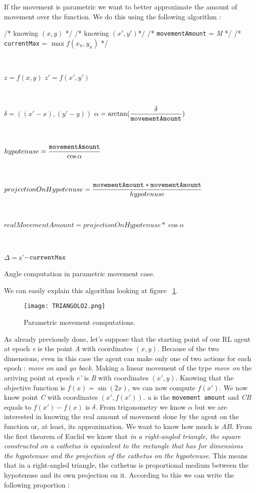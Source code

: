 If the movement is parametric we want to better approximate the amount of movement over the function. We do this using the following algorithm :

\begin{algorithm}
	/* knowing $(x, y)$ */ \;
	/* knowing $(x', y')$*/ \;
	/* {\tt movementAmount} = \textit{M} */ \;
	/* {\tt currentMax} = $\max f(x_n, y_n)$ */ \;
	
	
	\
	
	$z = f(x, y)$ \;
	$z' = f(x', y')$\;
	
	\
	
	$\delta = ((x'-x),  (y'-y))$ \;
	$\alpha = \arctan(\dfrac{\delta}{\tt movementAmount})$ \;
	
	\
	
	$hypotenuse = \dfrac{{\tt movementAmount}}{\cos \alpha}$ \;
	
	\
	
	$projectionOnHypotenuse = \dfrac{{\tt movementAmount} * {\tt movementAmount}}{hypotenuse}$ \;
	
	\
	
	$realMovementAmount = projectionOnHypotenuse * \cos \alpha$ \;
	 
	 \
	
	$\Delta = $z'$ - {\tt currentMax} $\;
	
	\caption{Angle computation in parametric movement case.} 
	\label{PMAlgo}
	
\end{algorithm}

We can easily explain this algorithm looking at figure ~\ref{fig:PMComputations}. 

\begin{figure} [h!]
	\centering
	\texttt{[image: TRIANGOLO2.png]}
	\caption{Parametric movement computations.}
	\label{fig:PMComputations}
\end{figure}

As already previously done, let's suppose that the starting point of our RL agent at epoch \textit{e} is the point \textit{A} with coordinates $(x, y)$. Because of the two dimensions, even in this case the agent can make only one of two actions for each epoch : \textit{move on} and \textit{go back}. Making a linear movement of the type \textit{move on} the arriving point at epoch \textit{e'} is \textit{B} with coordinates $(x', y)$. Knowing that the objective function is $f(x) = \sin(2x)$, we can now compute $f(x')$. We now know point \textit{C} with coordinates $(x', f(x'))$. \textit{u} is the {\tt movement amount} and \textit{CB} equals to $f(x') - f(x)$ is $\delta$. From trigonometry we know $\alpha$ but we are interested in knowing the real amount of movement done by the agent on the function or, at least, its approximation. We want to know how much is $\overline{AB}$.  From the first theorem of Euclid we know that \textit{in a right-angled triangle, the square constructed on a cathetus is equivalent to the rectangle that has for dimensions the hypotenuse and the projection of the cathetus on the hypotenuse}. This means that in a right-angled triangle, the cathetus is proportional medium between the hypotenuse and its own projection on it. According to this we can write the following proportion :

